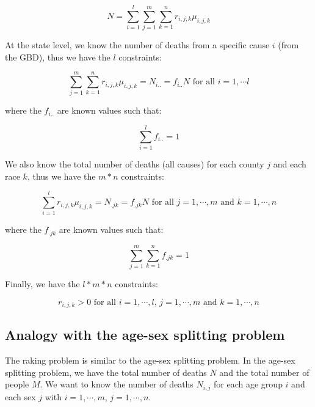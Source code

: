 \begin{equation*}
N = \sum_{i = 1}^l \sum_{j = 1}^m \sum_{k = 1}^n r_{i,j,k} \mu_{i,j,k}
\end{equation*}

At the state level, we know the number of deaths from a specific cause $i$ (from the GBD), thus we have the $l$ constraints:

\begin{equation*}
\sum_{j = 1}^m \sum_{k = 1}^n r_{i,j,k} \mu_{i,j,k} = N_{i..} = f_{i..} N \text{ for all } i = 1 , \cdots l
\end{equation*}

where the $f_{i..}$ are known values such that:

\begin{equation*}
\sum_{i = 1}^l f_{i..} = 1
\end{equation*}

We also know the total number of deaths (all causes) for each county $j$ and each race $k$, thus we have the $m * n$ constraints:

\begin{equation*}
\sum_{i = 1}^l r_{i,j,k} \mu_{i,j,k} = N_{.jk} = f_{.jk} N \text{ for all } j = 1 , \cdots , m \text{ and } k = 1 , \cdots , n
\end{equation*}

where the $f_{.jk}$ are known values such that:

\begin{equation*}
\sum_{j = 1}^m \sum_{k = 1}^n f_{.jk} = 1
\end{equation*}

Finally, we have the $l * m * n$ constraints:

\begin{equation*}
r_{i,j,k} > 0 \text{ for all } i = 1 , \cdots , l \text{, } j = 1 , \cdots , m \text{ and } k = 1 , \cdots , n
\end{equation*}

\subsection{Analogy with the age-sex splitting problem}

The raking problem is similar to the age-sex splitting problem. In the age-sex splitting problem, we have the total number of deaths $N$ and the total number of people $M$. We want to know the number of deaths $N_{i,j}$ for each age group $i$ and each sex $j$ with $i = 1 , \cdots , m$, $j = 1 , \cdots , n$.

